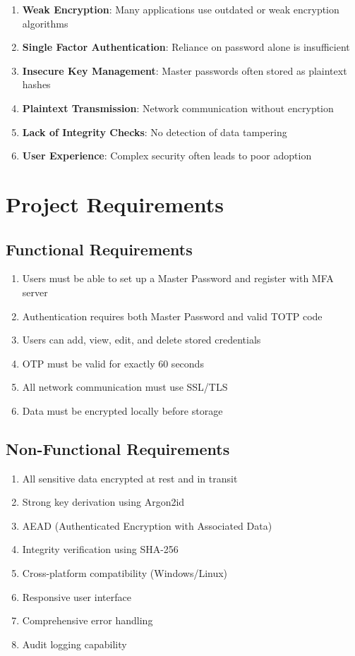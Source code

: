 \documentclass[12pt,a4paper]{report}
\begin{document}
\begin{enumerate}
    \item \textbf{Weak Encryption}: Many applications use outdated or weak encryption algorithms
    \item \textbf{Single Factor Authentication}: Reliance on password alone is insufficient
    \item \textbf{Insecure Key Management}: Master passwords often stored as plaintext hashes
    \item \textbf{Plaintext Transmission}: Network communication without encryption
    \item \textbf{Lack of Integrity Checks}: No detection of data tampering
    \item \textbf{User Experience}: Complex security often leads to poor adoption
\end{enumerate}

\section{Project Requirements}

\subsection{Functional Requirements}

\begin{enumerate}
    \item Users must be able to set up a Master Password and register with MFA server
    \item Authentication requires both Master Password and valid TOTP code
    \item Users can add, view, edit, and delete stored credentials
    \item OTP must be valid for exactly 60 seconds
    \item All network communication must use SSL/TLS
    \item Data must be encrypted locally before storage
\end{enumerate}

\subsection{Non-Functional Requirements}

\begin{enumerate}
    \item All sensitive data encrypted at rest and in transit
    \item Strong key derivation using Argon2id
    \item AEAD (Authenticated Encryption with Associated Data)
    \item Integrity verification using SHA-256
    \item Cross-platform compatibility (Windows/Linux)
    \item Responsive user interface
    \item Comprehensive error handling
    \item Audit logging capability
\end{enumerate}
\end{document}

